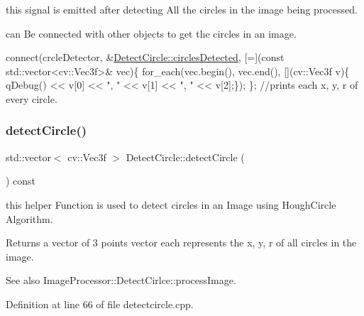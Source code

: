 this signal is emitted after detecting All the circles in the image being processed. 

can Be connected with other objects to get the circles in an image.


\begin{DoxyCode}
connect(crcleDetector, &\hyperlink{class_image_processor_1_1_detect_circle_a2c399b3380a2830317c701d47d4db004}{DetectCircle::circlesDetected}, [=](\textcolor{keyword}{const} 
      std::vector<cv::Vec3f>& vec)\{
     for\_each(vec.begin(), vec.end(), [](cv::Vec3f v)\{ qDebug() << v[0] << \textcolor{stringliteral}{", "} << v[1] << \textcolor{stringliteral}{", "} << v[2];\});
\}; \textcolor{comment}{//prints each x, y, r of every circle.}
\end{DoxyCode}
 \mbox{\label{class_image_processor_1_1_detect_circle_a6324c8bfcc4e8df8d584a037250b22b2}} 
\subsubsection{\texorpdfstring{detect\+Circle()}{detectCircle()}}
{\footnotesize\ttfamily std\+::vector$<$ cv\+::\+Vec3f $>$ Detect\+Circle\+::detect\+Circle (\begin{DoxyParamCaption}{ }\end{DoxyParamCaption}) const}



this helper Function is used to detect circles in an Image using Hough\+Circle Algorithm. 

\begin{DoxyReturn}{Returns}
a vector of 3 points vector each represents the x, y, r of all circles in the image. 
\end{DoxyReturn}
\begin{DoxySeeAlso}{See also}
Image\+Processor\+::\+Detect\+Cirlce\+::process\+Image. 
\end{DoxySeeAlso}


Definition at line 66 of file detectcircle.\+cpp.

\mbox{\label{class_image_processor_1_1_detect_circle_ae0c7b4759827b218a03b16567233b4d5}} 
